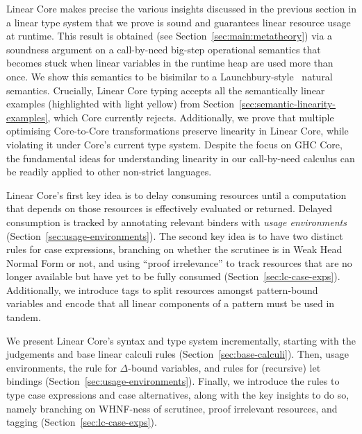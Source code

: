 \documentclass[acmsmall,review,anonymous,screen]{acmart}
\newcommand{\notyetcolorname}{light yellow}
\begin{document}
Linear Core makes precise the various insights discussed in the
previous section in a linear type system that we prove is sound and guarantees
linear resource usage at runtime.
This result is obtained (see Section~\ref{sec:main:metatheory}) via a soundness argument on a
call-by-need big-step operational semantics that becomes stuck when linear
variables in the runtime heap are used more than once. We show this
semantics to be bisimilar to a
Launchbury-style~\cite{10.1145/158511.158618} natural semantics. 
Crucially,
Linear Core typing accepts all the semantically linear examples
(highlighted with \colorbox{notyet}{\notyetcolorname})
from Section~\ref{sec:semantic-linearity-examples}, which Core currently
rejects.
%
Additionally, we prove that multiple optimising Core-to-Core transformations
preserve linearity in Linear Core, while violating it under Core's
current type system.
%
% 
Despite the focus on GHC Core, the fundamental ideas for
understanding linearity in our call-by-need calculus can be readily applied to
other non-strict languages.

Linear Core's first key idea is to delay consuming
resources until a computation that depends on those resources is effectively
evaluated or returned. Delayed consumption is tracked by annotating relevant
binders with \emph{usage environments} (Section~\ref{sec:usage-environments}).
%
The second key idea is to have two distinct rules for case
expressions, branching on whether the scrutinee is in Weak Head Normal
Form or not, and using ``proof irrelevance'' to track resources that are no
longer available but have yet to be fully consumed
(Section~\ref{sec:lc-case-exps}). Additionally, we introduce tags to split
resources amongst pattern-bound variables and %
encode that all linear components of a pattern must be used in tandem.

We present Linear Core's syntax and type system incrementally, starting with the
judgements and base linear calculi rules (Section~\ref{sec:base-calculi}).
%
Then, usage environments, the rule for $\Delta$-bound variables, and rules for
(recursive) let bindings (Section~\ref{sec:usage-environments}).
%
Finally, we introduce the rules to type case expressions and case alternatives,
along with the key insights to do so, namely branching on WHNF-ness of
scrutinee, proof irrelevant resources, and tagging (Section~\ref{sec:lc-case-exps}).
\end{document}
